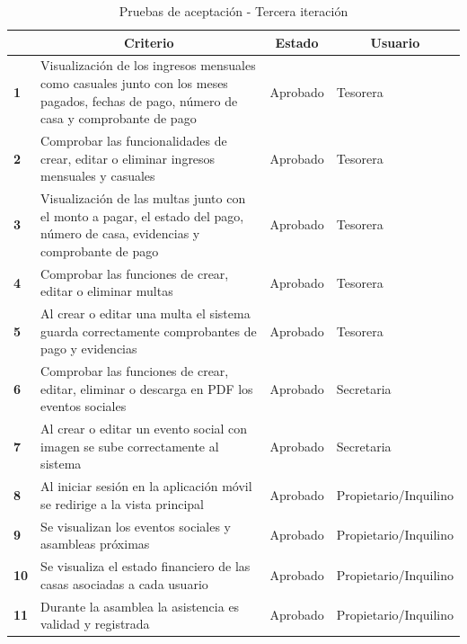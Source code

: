 \begin{footnotesize}
\begin{spacing}{1}
    \begin{center}
    \renewcommand*{\arraystretch}{1.4}
    \begin{longtable}{ |>{\bfseries}l|p{}|l|l| }
        \caption{Pruebas de aceptación - Tercera iteración}\\
        \hline
        \multicolumn{1}{|c|}{ \textbf{N.}} & \multicolumn{1}{c|}{\textbf{Criterio}} & \multicolumn{1}{c|}{ \textbf{Estado}} & \multicolumn{1}{c|}{ \textbf{Usuario}}\\
        \hline
        1 & Visualización de los ingresos mensuales como casuales junto con los meses pagados, fechas de pago, número de casa y comprobante de pago & Aprobado & Tesorera\\
        \hline
        2 & Comprobar las funcionalidades de crear, editar o eliminar ingresos mensuales y casuales & Aprobado & Tesorera\\
        \hline
        3 & Visualización de las multas junto con el monto a pagar, el estado del pago, número de casa, evidencias y comprobante de pago & Aprobado & Tesorera\\
        \hline
        4 & Comprobar las funciones de crear, editar o eliminar multas & Aprobado & Tesorera\\
        \hline
        5 & Al crear o editar una multa el sistema guarda correctamente comprobantes de pago y evidencias & Aprobado & Tesorera\\
        \hline
        6 & Comprobar las funciones de crear, editar, eliminar o descarga en PDF los eventos sociales  & Aprobado & Secretaria\\
        \hline
        7 & Al crear o editar un evento social con imagen se sube correctamente al sistema  & Aprobado & Secretaria\\
        \hline
        8 & Al iniciar sesión en la aplicación móvil se redirige a la vista principal & Aprobado & Propietario/Inquilino\\
        \hline
        9 & Se visualizan los eventos sociales y asambleas próximas & Aprobado & Propietario/Inquilino\\
        \hline
        10 & Se visualiza el estado financiero de las casas asociadas a cada usuario & Aprobado & Propietario/Inquilino\\
        \hline
        11 & Durante la asamblea la asistencia es validad y registrada & Aprobado & Propietario/Inquilino\\

\end{longtable}
\end{center}
\end{spacing}
\end{footnotesize}

